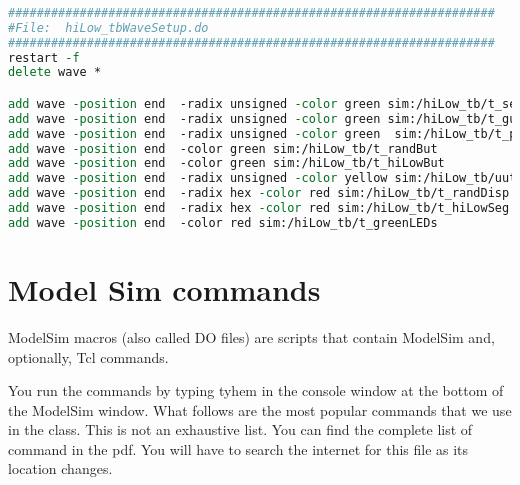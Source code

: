 


\begin{lstlisting}[language=tcl,  
caption={do file for  hiLow\_tb.},  
label={listing:howToDoFile},
basicstyle=\tiny,
frame=single]
 
####################################################################
#File:	hiLow_tbWaveSetup.do
####################################################################
restart -f
delete wave *

add wave -position end  -radix unsigned -color green sim:/hiLow_tb/t_seedSwitch
add wave -position end  -radix unsigned -color green sim:/hiLow_tb/t_guessSwitch
add wave -position end  -radix unsigned -color green  sim:/hiLow_tb/t_playSwitch
add wave -position end  -color green sim:/hiLow_tb/t_randBut
add wave -position end  -color green sim:/hiLow_tb/t_hiLowBut
add wave -position end  -radix unsigned -color yellow sim:/hiLow_tb/uut/randNum
add wave -position end  -radix hex -color red sim:/hiLow_tb/t_randDisp
add wave -position end  -radix hex -color red sim:/hiLow_tb/t_hiLowSeg
add wave -position end  -color red sim:/hiLow_tb/t_greenLEDs

    \end{lstlisting}

\section{Model Sim commands}
ModelSim macros (also called DO files) are scripts that contain ModelSim and, optionally, Tcl commands.

You run the commands by typing tyhem in the console window at the bottom of the ModelSim window.
What follows are the most popular commands that we use in the class.  This is not an exhaustive list.
You can find the complete list of command in the 
 pdf.  You will have to search
the internet for this file as its location changes.  

